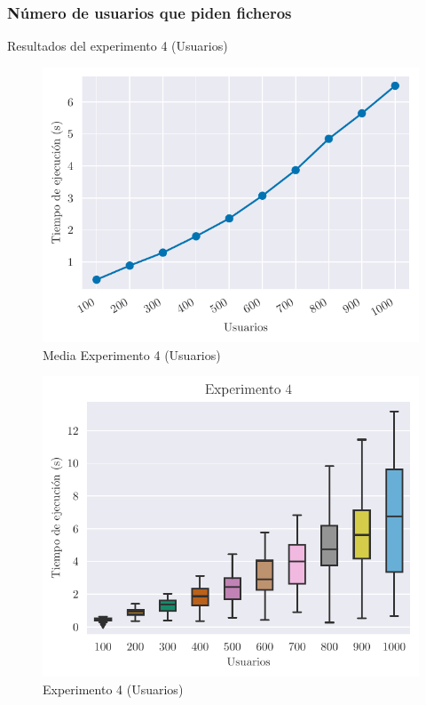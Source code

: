\subsubsection{Número de usuarios que piden ficheros}

\begin{table}[H]
    \caption{Resultados del experimento 4 (Usuarios)}%
    \label{tab:ex4u}
    \begin{center}
    
    \end{center}
\end{table}

\begin{figure}[H]
    \centering
    \includegraphics{include/plots/ex4_u_mean_time.pdf}
    \caption{Media Experimento 4 (Usuarios)}%
    \label{fig:ex4u_mean}
\end{figure}

\begin{figure}[H]
    \centering
    \includegraphics{include/plots/ex4_u_time_bplot.pdf}
    \caption{Experimento 4 (Usuarios)}%
    \label{fig:ex4u}
\end{figure}

